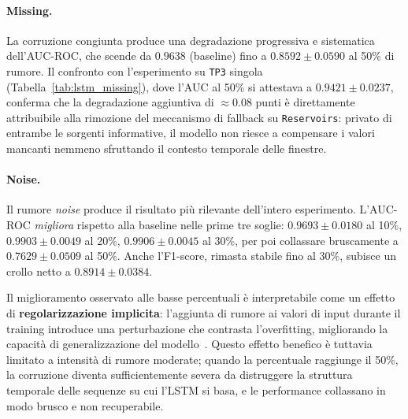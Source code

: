 \documentclass[../main.tex]{subfiles}
\begin{document}
\paragraph{Missing.}
La corruzione congiunta produce una degradazione progressiva e sistematica dell'AUC-ROC, che scende da $0.9638$ (baseline) fino a $0.8592 \pm 0.0590$ al 50\% di rumore. Il confronto con l'esperimento su \texttt{TP3} singola (Tabella~\ref{tab:lstm_missing}), dove l'AUC al 50\% si attestava a $0.9421 \pm 0.0237$, conferma che la degradazione aggiuntiva di $\approx 0.08$ punti è direttamente attribuibile alla rimozione del meccanismo di fallback su \texttt{Reservoirs}: privato di entrambe le sorgenti informative, il modello non riesce a compensare i valori mancanti nemmeno sfruttando il contesto temporale delle finestre. %

\paragraph{Noise.}
Il rumore \textit{noise} produce il risultato più rilevante dell'intero esperimento. L'AUC-ROC \textit{migliora} rispetto alla baseline nelle prime tre soglie: $0.9693 \pm 0.0180$ al 10\%, $0.9903 \pm 0.0049$ al 20\%, $0.9906 \pm 0.0045$ al 30\%, per poi collassare bruscamente a $0.7629 \pm 0.0509$ al 50\%. Anche l'F1-score, rimasta stabile fino al 30\%, subisce un crollo netto a $0.8914 \pm 0.0384$.

Il miglioramento osservato alle basse percentuali è interpretabile come un effetto di \textbf{regolarizzazione implicita}: l'aggiunta di rumore ai valori di input durante il training introduce una perturbazione che contrasta l'overfitting, migliorando la capacità di generalizzazione del modello~\cite{10.1162/neco.1995.7.1.108}. Questo effetto benefico è tuttavia limitato a intensità di rumore moderate; quando la percentuale raggiunge il 50\%, la corruzione diventa sufficientemente severa da distruggere la struttura temporale delle sequenze su cui l'LSTM si basa, e le performance collassano in modo brusco e non recuperabile.%
\end{document}
